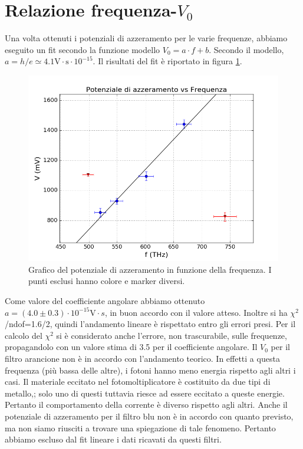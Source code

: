 \documentclass[10pt,a4paper]{article}
\begin{document}
\section{Relazione frequenza-$V_0$}
Una volta ottenuti i potenziali di azzeramento per le varie frequenze, abbiamo eseguito un fit secondo la funzione modello $V_0=a\cdot f + b$.
Secondo il modello, $a = h/e\simeq 4.1 \mbox{V}\cdot\mbox{s}\cdot10^{-15}$.
Il risultati del fit è riportato in figura \ref{fig:fitfinale}.
\begin{figure}[!htb]
\centering
\includegraphics[scale=0.7]{fitfinale.png}
\caption{Grafico del potenziale di azzeramento in funzione della frequenza. I punti esclusi hanno colore e marker diversi.\label{fig:fitfinale}}
\end{figure}

Come valore del coefficiente angolare abbiamo ottenuto $a = (4.0\pm 0.3)\cdot10^{-15} \mbox{V}\cdot{s}$, in buon accordo con il valore atteso.
Inoltre si ha $\chi ^2$/ndof=1.6/2, quindi l'andamento lineare è rispettato entro gli errori presi. 
Per il calcolo del $\chi^2$ si è considerato anche l'errore, non trascurabile, sulle frequenze, propagandolo con un valore stima di 3.5 per il coefficiente angolare.
Il $V_0$ per il filtro arancione non è in accordo con l'andamento teorico. In effetti a questa frequenza (più bassa delle altre), i fotoni hanno meno energia rispetto agli altri i casi. Il materiale eccitato nel fotomoltiplicatore è costituito da due tipi di metallo,; solo uno di questi tuttavia riesce ad essere eccitato a queste energie. Pertanto il comportamento della corrente è  diverso rispetto agli altri.
Anche il potenziale di azzeramento per il filtro blu non è in accordo con quanto previsto, ma non siamo riusciti a trovare una spiegazione di tale fenomeno. Pertanto abbiamo escluso dal fit lineare i dati ricavati da questi filtri.
\end{document}
